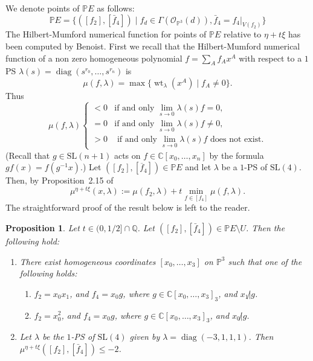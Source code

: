 \documentclass[11pt]{amsart}
\numberwithin{equation}{section}
\theoremstyle{plain}
\newtheorem{proposition}[theorem]{Proposition}
\theoremstyle{remark}
\theoremstyle{definition}
\newcommand{\bP}{\mathbb{P}}
\newcommand{\calO}{\mathcal{O}}
\newcommand{\SL}{\mathrm{SL}}
\newcommand{\CC}{{\mathbb C}}
\newcommand{\ov}{\overline}
\newcommand{\PP}{{\mathbb P}}
\newcommand{\QQ}{{\mathbb Q}}
\DeclareMathOperator{\diag}{diag}
\DeclareMathOperator{\weight}{wt}
\begin{document}
We denote points of $\PP E$ as follows:
\begin{equation}\label{eqpe}
\bP E=\{([f_2],[\bar{f}_4])\mid f_d\in\Gamma(\calO_{\bP^3}(d)), \bar{f}_4=f_4|_{V(f_2)}\}
\end{equation}
%
The Hilbert-Mumford numerical function for points of $\PP E$ relative to $\eta+t\xi$ has been computed by Benoist. 
First we recall that the Hilbert-Mumford numerical function of a non zero homogeneous polynomial $f=\sum_A f_A x^A$ with respect to a $1$ PS $\lambda(s)=\diag(s^{r_0},\ldots,s^{r_n})$ is
%
\begin{equation}\label{numfun}
%
\mu(f,\lambda)=\max\{ \weight_{\lambda}(x^{A}) \mid f_A\not=0\}.
%
\end{equation}
%
Thus 
%
\begin{equation*}
%
\mu(f,\lambda)
%
\begin{cases}
%
<0 & \text{if and only $\lim\limits_{s\to 0}\lambda(s)f=0$,} \\
%
=0 & \text{if and only $\lim\limits_{s\to 0}\lambda(s)f\not=0$,} \\
%
>0 & \text{ if and only $\lim\limits_{s\to 0}\lambda(s)f$ does not exist.}
%
\end{cases}
%
\end{equation*}
%
(Recall that  $g\in\SL(n+1)$ acts on $f\in\CC[x_0,\ldots,x_n]$ by the formula $gf(x)=f(g^{-1}x)$.) 
Let $([f_2],[\ov{f}_4])\in  \bP E$ and let $\lambda$ be a $1$-PS of $\SL(4)$. Then, by   Proposition~2.15 of~\cite{benoist}
 \begin{equation}\label{benfor}
%
\mu^{\eta+t\xi}(x,\lambda):=\mu(f_2,\lambda)+t\min_{f\in[f_4]}\mu(f,\lambda).
%
\end{equation}
%
   The  straightforward proof of the result below is left to the reader.
%
\begin{proposition}\label{prp:facile}
%
Let $t\in(0,1/2]\cap\QQ$.  Let $([f_2],[\bar{f}_4])\in \PP E\setminus U$. Then the following hold:
%
\begin{enumerate}
%
\item
%
There exist homogeneous coordinates $[x_0,\ldots,x_3]$ on $\PP^3$ such that 
one of the following holds:
%
\begin{enumerate}
%
\item
%
$f_2=x_0x_1$, and $f_4=x_0 g$, where $g\in\CC[x_0,\ldots,x_3]_{3}$, and $x_1\not | g$. 
%
\item
%
$f_2=x^2_0$, and $f_4=x_0 g$, where $g\in\CC[x_0,\ldots,x_3]_{3}$, and $x_0\not | g$. 
% 
\end{enumerate}
%
%
\item
%
Let $\lambda$ be the $1$-PS of $\SL(4)$ given by $\lambda=\diag(-3,1,1,1)$. Then $\mu^{\eta+t\xi}([f_2],[\bar{f}_4])\le -2$. 
% 
\end{enumerate}
%
%
\end{proposition}
\end{document}
